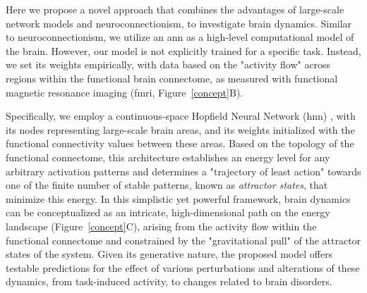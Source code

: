 \documentclass{article}
\begin{document}
Here we propose a novel approach that combines the advantages of large-scale network models and neuroconnectionism, to investigate brain dynamics.
Similar to neuroconnectionism, we utilize an \acrshort{ann} as a high-level computational model of the brain.
However, our model is not explicitly trained for a specific task. Instead, we set its weights empirically, with data based on the "activity flow" \citep{cole2016activity, ito2017cognitive} across regions within the functional brain connectome, as measured with functional magnetic resonance imaging (\acrshort{fmri}, Figure~\ref{concept}B).

Specifically, we employ a continuous-space Hopfield Neural Network (\acrshort{hnn}) \citep{hopfield1982neural, krotov2023new}, with its nodes representing large-scale brain areas, and its weights initialized with the functional connectivity values between these areas.
Based on the topology of the functional connectome, this architecture establishes an energy level for any arbitrary activation patterns and determines a "trajectory of least action" towards one of the finite number of stable patterns, known as \textit{attractor states}, that minimize this energy.
In this simplistic yet powerful framework, brain dynamics can be conceptualized as an intricate, high-dimensional path on the energy landscape (Figure~\ref{concept}C), arising from the activity flow \citep{cole2016activity} within the functional connectome and constrained by the "gravitational pull" of the attractor states of the system.
Given its generative nature, the proposed model offers testable predictions for the effect of various perturbations and alterations of these dynamics, from task-induced activity, to changes related to brain disorders.
\end{document}
